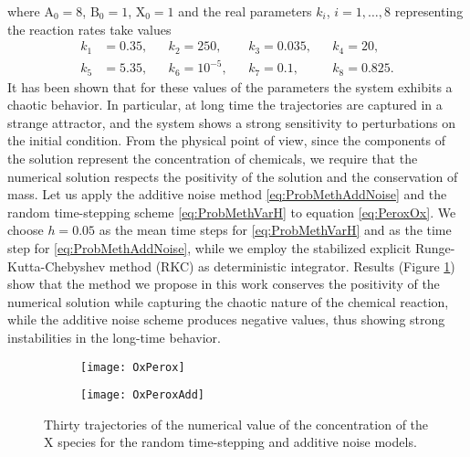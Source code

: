 \documentclass{siamart1116}
\numberwithin{theorem}{section}
\begin{document}
where $\mathrm{A}_0 = 8$, $\mathrm{B}_0 = 1$, $\mathrm{X}_0 = 1$ and the real parameters $k_i$, $i = 1, \ldots, 8$ representing the reaction rates take values
\begin{equation}
\begin{aligned}
k_1 &= 0.35, &&k_2 = 250, &&k_3 = 0.035, &&k_4 = 20,\\
k_5 &= 5.35, &&k_6 = 10^{-5}, &&k_7 = 0.1, &&k_8 = 0.825.
\end{aligned}
\end{equation}            
It has been shown \cite{Ols83} that for these values of the parameters the system exhibits a chaotic behavior. In particular, at long time the trajectories are captured in a strange attractor, and the system shows a strong sensitivity to perturbations on the initial condition. From the physical point of view, since the components of the solution represent the concentration of chemicals, we require that the numerical solution respects the positivity of the solution and the conservation of mass. Let us apply the additive noise method \eqref{eq:ProbMethAddNoise} and the random time-stepping scheme \eqref{eq:ProbMethVarH} to equation \eqref{eq:PeroxOx}. We choose $h = 0.05$ as the mean time steps for \eqref{eq:ProbMethVarH} and as the time step for \eqref{eq:ProbMethAddNoise}, while we employ the stabilized explicit Runge-Kutta-Chebyshev method (RKC) \cite{HoK71} as deterministic integrator. Results (Figure \ref{fig:OxPeroxTraj}) show that the method we propose in this work conserves the positivity of the numerical solution while capturing the chaotic nature of the chemical reaction, while the additive noise scheme produces negative values, thus showing strong instabilities in the long-time behavior.
\begin{figure}
	\begin{center} 
		\begin{subfigure}[b]{1\textwidth}
			\centering
			\hspace{-0.3cm}\texttt{[image: OxPerox]}
		\end{subfigure}	
		\begin{subfigure}[b]{1\textwidth}
			\centering
			\texttt{[image: OxPeroxAdd]}
		\end{subfigure} 
	\end{center}
	\caption{Thirty trajectories of the numerical value of the concentration of the X species for the random time-stepping and additive noise models.}
	\label{fig:OxPeroxTraj}
\end{figure}
\end{document}
